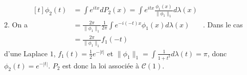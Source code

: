\documentclass{report}
\begin{document}
2. On a $\begin{aligned}[t]
\phi_2(t) &= \int e^{itx}dP_2(x) = \int e^{itx}\frac{\phi_1(x)}{\|\phi_1\|_1} d\lambda(x)\\
&= \frac{2\pi}{\|\phi_1\|_1} \frac{1}{2\pi} \int e^{-i(-t)x} \phi_1(x) d\lambda(x)\\
&= \frac{2\pi}{\|\phi_1\|_1} f_1(-t)
\end{aligned}$\newline
{}. Dans le cas d'une Laplace $1$, $f_1(t)=\frac 12 e^{-|t|}$ et $\|\phi_1\|_1 = \int \frac{1}{1+t^2}d\lambda(t)=\pi$, donc $\phi_2(t)=e^{-|t|}$.
$P_2$ est donc la loi associée à $\mathcal C(1)$.
\end{document}
